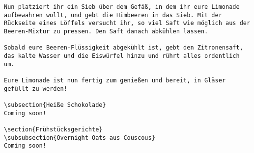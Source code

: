 \begin{verbatim}
Nun platziert ihr ein Sieb über dem Gefäß, in dem ihr eure Limonade aufbewahren wollt, und gebt die Himbeeren in das Sieb. Mit der Rückseite eines Löffels versucht ihr, so viel Saft wie möglich aus der Beeren-Mixtur zu pressen. Den Saft danach abkühlen lassen.
	
Sobald eure Beeren-Flüssigkeit abgekühlt ist, gebt den Zitronensaft, das kalte Wasser und die Eiswürfel hinzu und rührt alles ordentlich um.
	
Eure Limonade ist nun fertig zum genießen und bereit, in Gläser gefüllt zu werden!
	
\subsection{Heiße Schokolade}
Coming soon!
	
\section{Frühstücksgerichte}
\subsubsection{Overnight Oats aus Couscous}
Coming soon!
	

\end{verbatim}
